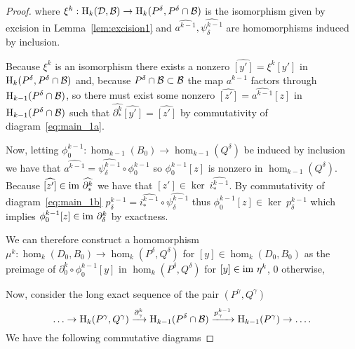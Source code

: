 \begin{proof}
  \noindent where $\xi^k : \mathrm{H}_k({\mathcal{D}}, {\mathcal{B}}) \to \mathrm{H}_k(P^\delta, P^\delta\cap {\mathcal{B}})$ is the isomorphism given by excision in Lemma~\ref{lem:excision1} and $\widehat{a^{k-1}}, \widehat{\psi_\delta^{k-1}}$ are homomorphisms induced by inclusion.

  Because $\xi^k$ is an isomorphism there exists a nonzero $\widehat{[y']} = \xi^k[y']$ in $\mathrm{H}_k(P^\delta, P^\delta\cap {\mathcal{B}})$ and, because $P^\delta\cap {\mathcal{B}}\subset {\mathcal{B}}$ the map $a^{k-1}$ factors through $\mathrm{H}_{k-1}(P^\delta\cap {\mathcal{B}})$, so there must exist some nonzero $\widehat{[z']} = \widehat{a^{k-1}}[z]$ in $\mathrm{H}_{k-1}(P^\delta\cap {\mathcal{B}})$ such that $\widehat{\partial^k_*}\widehat{[y']} = \widehat{[z']}$ by commutativity of diagram~\ref{eq:main_1a}.

  Now, letting $\phi_0^{k-1} : \hom_{k-1}(B_0)\to\hom_{k-1}(Q^\delta)$ be induced by inclusion we have that $\widehat{a^{k-1}} = \widehat{\psi_\delta^{k-1}}\circ \phi_0^{k-1}$ so $\phi_0^{k-1}[z]$ is nonzero in $\hom_{k-1}(Q^\delta)$.
  Because $\widehat{[z']}\in\mathrm{im}~\widehat{\partial_*^k}$ we have that $\widehat{[z']}\in\ker~\widehat{i_*^{k-1}}$.
  By commutativity of diagram~\ref{eq:main_1b} $p_\delta^{k-1} = \widehat{i_*^{k-1}}\circ\widehat{\psi_\delta^{k-1}}$ thus $\phi_0^{k-1}[z]\in\ker~p_\delta^{k-1}$ which implies $\phi_0^{k-1}[z]\in\mathrm{im}~\partial_\delta^k$ by exactness.

  We can therefore construct a homomorphism $\mu^k : \hom_k(D_0, B_0) \to \hom_k(P^\delta, Q^\delta)$ for $[y]\in \hom_k(D_0, B_0)$ as the preimage of $\partial_0^k\circ\phi_0^{k-1}[y]$ in $\hom_k(P^\delta, Q^\delta)$ for $[y]\in\mathrm{im}~\eta^k$, $0$ otherwise,

  Now, consider the long exact sequence of the pair $(P^\gamma, Q^\gamma)$
  \[\ldots\to\mathrm{H}_k(P^\gamma, Q^\gamma)\xrightarrow{\partial^k_\gamma}
    \mathrm{H}_{k-1}(P^\delta\cap {\mathcal{B}})\xrightarrow{p^{k-1}_\gamma}
    \mathrm{H}_{k-1}(P^\gamma)\to\ldots.\]
  We have the following commutative diagrams


\end{proof}
